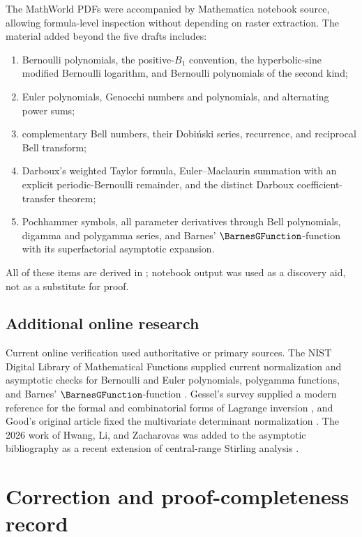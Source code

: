\documentclass[11pt,a4paper,oneside,openany]{book}
\theoremstyle{definition}
\theoremstyle{remark}
\begin{document}
The MathWorld PDFs were accompanied by Mathematica notebook source, allowing
formula-level inspection without depending on raster extraction.  The material
added beyond the five drafts includes:
\begin{enumerate}
\item Bernoulli polynomials, the positive-$B_1$ convention, the hyperbolic-sine
      modified Bernoulli logarithm, and Bernoulli polynomials of the second
      kind;
\item Euler polynomials, Genocchi numbers and polynomials, and alternating
      power sums;
\item complementary Bell numbers, their Dobiński series, recurrence, and
      reciprocal Bell transform;
\item Darboux's weighted Taylor formula, Euler--Maclaurin summation with an
      explicit periodic-Bernoulli remainder, and the distinct Darboux
      coefficient-transfer theorem;
\item Pochhammer symbols, all parameter derivatives through Bell polynomials,
      digamma and polygamma series, and Barnes' $\BarnesGFunction$-function with its
      superfactorial asymptotic expansion.
\end{enumerate}
All of these items are derived in
; notebook output was
used as a discovery aid, not as a substitute for proof.

\section{Additional online research}

Current online verification used authoritative or primary sources.  The NIST
Digital Library of Mathematical Functions supplied current normalization and
asymptotic checks for Bernoulli and Euler polynomials, polygamma functions, and
Barnes' $\BarnesGFunction$-function \cite{NISTDLMF}.  Gessel's survey supplied a modern
reference for the formal and combinatorial forms of Lagrange inversion
\cite{Gessel2016}, and Good's original article fixed the multivariate determinant
normalization \cite{Good1960}.  The 2026 work of Hwang, Li, and Zacharovas was
added to the asymptotic bibliography as a recent extension of central-range
Stirling analysis \cite{HwangLiZacharovas2026}.

\chapter{Correction and proof-completeness record}
\label{ch:correction-record}
\end{document}
